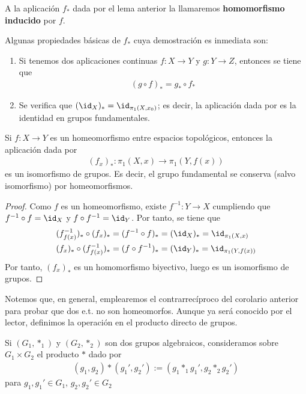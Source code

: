 \begin{definicion}
    A la aplicación $f_*$ dada por el lema anterior la llamaremos \textbf{homomorfismo inducido} por $f$.
\end{definicion}

\begin{propiedades}
    Algunas propiedades básicas de $f_*$ cuya demostración es inmediata son:
    \begin{enumerate}
        \item Si tenemos dos aplicaciones continuas $f:X\to Y$ y $g:Y \to Z$, entonces se tiene que 
        \begin{gather*}
            (g\circ f)_* = g_* \circ f_*
        \end{gather*}

        \item  Se verifica que $(\id_X)_*=\id_{\pi_1(X,x_0)}$; es decir,
        la aplicación dada por
        es la identidad en grupos fundamentales.
    \end{enumerate}
\end{propiedades}

\begin{coro}
    Si $f:X\to Y$ es un homeomorfismo entre espacios topológicos, entonces la aplicación dada por
    \begin{gather*}
        (f_x)_*:\pi_1(X,x) \to \pi_1(Y,f(x))
    \end{gather*}
    es un isomorfismo de grupos. Es decir, el grupo fundamental se conserva (salvo isomorfismo) por homeomorfismos.
\end{coro}
\begin{proof}
    Como $f$ es un homeomorfismo, existe $f^{-1}:Y\to X$ cumpliendo que $f^{-1}\circ f = \id_X$ y $f\circ f^{-1} = \id_Y$. Por tanto, se tiene que
    \begin{align*}
        (f^{-1}_{f(x)})_* \circ (f_x)_* &= (f^{-1}\circ f)_* = (\id_X)_* = \id_{\pi_1(X,x)}\\
        (f_x)_* \circ (f^{-1}_{f(x)})_* &= (f\circ f^{-1})_* = (\id_Y)_* = \id_{\pi_1(Y,f(x))}
    \end{align*}
    Por tanto, $(f_x)_*$ es un homomorfismo biyectivo, luego es un isomorfismo de grupos.
\end{proof}

Notemos que, en general, emplearemos el contrarrecíproco del corolario anterior para probar que dos e.t. no son homeomorfos. Aunque ya será conocido por el lector, definimos la operación en el producto directo de grupos.
\begin{definicion}
    Si $(G_1,\ast_1)$ y $(G_2, \ast_2)$ son dos grupos algebraicos, consideramos sobre $G_1\times G_2$ el producto $\ast$ dado por 
    \begin{gather*}
        (g_1,g_2)\ast(g_1',g_2') := (g_1\ast_1 g_1', g_2 \ast_2 g_2')
    \end{gather*}
    para $g_1,g_1'\in G_1$, $g_2,g_2'\in G_2$
\end{definicion}

